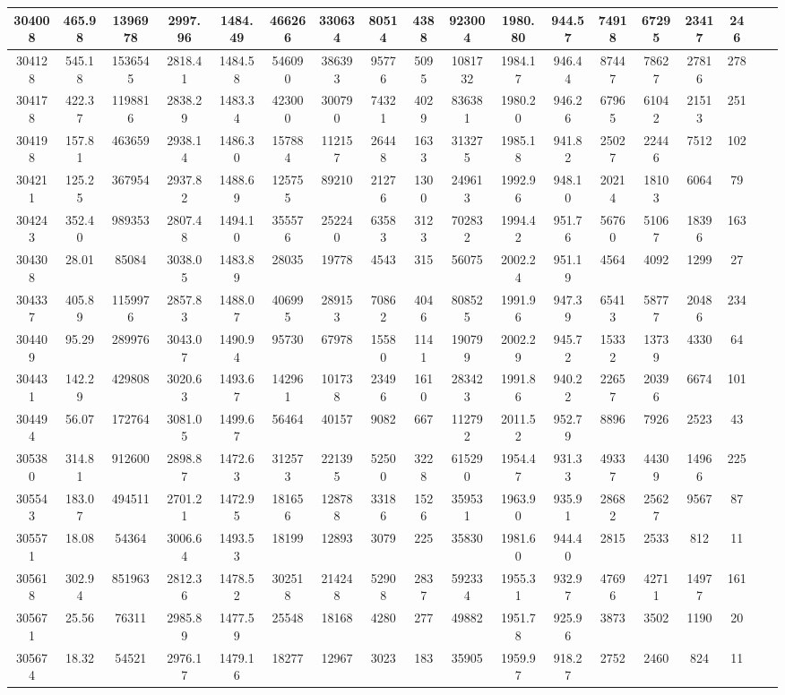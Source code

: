 \documentclass[10pt]{extarticle}
\begin{document}
\begin{longtable}{|c|c|c|c|c|c|c|c|c|c|c|c|c|c|c|c|c|c|}
\hline 
304008&465.98&1396978&2997.96&1484.49&466266&330634&80514&4388&923004&1980.80&944.57&74918&67295&23417&246 \\ 
\hline 
304128&545.18&1536545&2818.41&1484.58&546090&386393&95776&5095&1081732&1984.17&946.44&87447&78627&27816&278 \\ 
\hline 
304178&422.37&1198816&2838.29&1483.34&423000&300790&74321&4029&836381&1980.20&946.26&67965&61042&21513&251 \\ 
\hline 
304198&157.81&463659&2938.14&1486.30&157884&112157&26448&1633&313275&1985.18&941.82&25027&22446&7512&102 \\ 
\hline 
304211&125.25&367954&2937.82&1488.69&125755&89210&21276&1300&249613&1992.96&948.10&20214&18103&6064&79 \\ 
\hline 
304243&352.40&989353&2807.48&1494.10&355576&252240&63583&3123&702832&1994.42&951.76&56760&51067&18396&163 \\ 
\hline 
304308&28.01&85084&3038.05&1483.89&28035&19778&4543&315&56075&2002.24&951.19&4564&4092&1299&27 \\ 
\hline 
304337&405.89&1159976&2857.83&1488.07&406995&289153&70862&4046&808525&1991.96&947.39&65413&58777&20486&234 \\ 
\hline 
304409&95.29&289976&3043.07&1490.94&95730&67978&15580&1141&190799&2002.29&945.72&15332&13739&4330&64 \\ 
\hline 
304431&142.29&429808&3020.63&1493.67&142961&101738&23496&1610&283423&1991.86&940.22&22657&20396&6674&101 \\ 
\hline 
304494&56.07&172764&3081.05&1499.67&56464&40157&9082&667&112792&2011.52&952.79&8896&7926&2523&43 \\ 
\hline 
305380&314.81&912600&2898.87&1472.63&312573&221395&52500&3228&615290&1954.47&931.33&49337&44309&14966&225 \\ 
\hline 
305543&183.07&494511&2701.21&1472.95&181656&128788&33186&1526&359531&1963.90&935.91&28682&25627&9567&87 \\ 
\hline 
305571&18.08&54364&3006.64&1493.53&18199&12893&3079&225&35830&1981.60&944.40&2815&2533&812&11 \\ 
\hline 
305618&302.94&851963&2812.36&1478.52&302518&214248&52908&2837&592334&1955.31&932.97&47696&42711&14977&161 \\ 
\hline 
305671&25.56&76311&2985.89&1477.59&25548&18168&4280&277&49882&1951.78&925.96&3873&3502&1190&20 \\ 
\hline 
305674&18.32&54521&2976.17&1479.16&18277&12967&3023&183&35905&1959.97&918.27&2752&2460&824&11 \\ 

\end{longtable}
\end{document}
